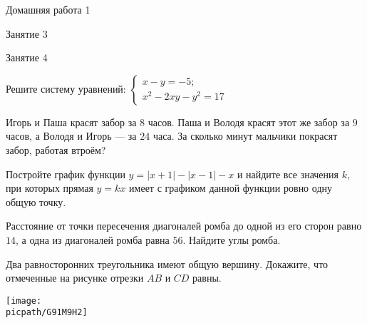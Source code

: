 \begin{homework}[number=1]
	\begin{listofex}
		\item Домашняя работа 1
	\end{listofex}
\end{homework}

\begin{class}[number=3]
	\begin{listofex}
		\item Занятие 3 
	\end{listofex}
\end{class}

\begin{class}[number=4]
	\begin{listofex}
		\item Занятие 4
	\end{listofex}
\end{class}

\begin{homework}[number=2]
	\begin{listofex}
		\item Решите систему уравнений: \( \begin{cases} x-y=-5; \\ x^2-2xy-y^2=17 \end{cases} \)
		\item Игорь и Паша красят забор за \( 8 \) часов. Паша и Володя красят этот же забор за \( 9 \) часов, а Володя и Игорь --- за \( 24 \) часа. За сколько минут мальчики покрасят забор, работая втроём?
		\item Постройте график функции \( y=|x+1|-|x-1|-x \) и найдите все значения \( k \), при которых прямая \( y=kx \) имеет с графиком данной функции ровно одну общую точку.
		\item Расстояние от точки пересечения диагоналей ромба до одной из его сторон равно \( 14 \), а одна из диагоналей ромба равна \( 56 \). Найдите углы ромба.
		\item 
		\begin{minipage}[t]{\bodywidth}
			Два равносторонних треугольника имеют общую вершину. Докажите, что отмеченные на рисунке отрезки \( AB \) и \( CD \) равны.
		\end{minipage}
		\gapwidth
		\begin{minipage}[t]{\picwidth}
			\texttt{[image: \\picpath/G91M9H2]}
		\end{minipage}
	\end{listofex}
\end{homework}

